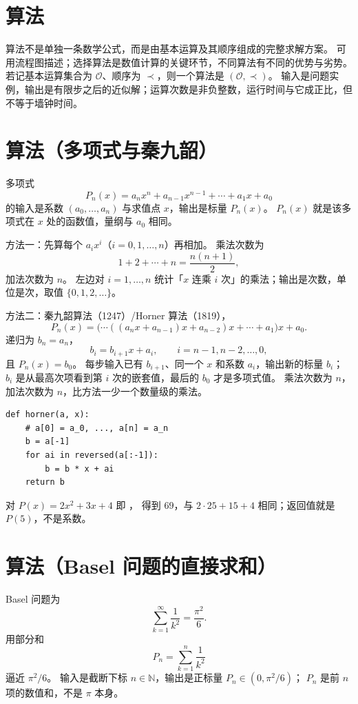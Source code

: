 \section{算法}

算法不是单独一条数学公式，而是由基本运算及其顺序组成的完整求解方案。
可用流程图描述；选择算法是数值计算的关键环节，不同算法有不同的优势与劣势。
若记基本运算集合为 $\mathcal{O}$、顺序为 $\prec$，则一个算法是 $(\mathcal{O},\prec)$。
输入是问题实例，输出是有限步之后的近似解；运算次数是非负整数，运行时间与它成正比，但不等于墙钟时间。

\section{算法（多项式与秦九韶）}

多项式
\[
P_n(x)=a_n x^n+a_{n-1}x^{n-1}+\cdots+a_1 x+a_0
\]
的输入是系数 $(a_0,\ldots,a_n)$ 与求值点 $x$，输出是标量 $P_n(x)$。
$P_n(x)$ 就是该多项式在 $x$ 处的函数值，量纲与 $a_0$ 相同。

方法一：先算每个 $a_i x^i$（$i=0,1,\ldots,n$）再相加。
乘法次数为
\[
1+2+\cdots+n=\frac{n(n+1)}{2},
\]
加法次数为 $n$。
左边对 $i=1,\ldots,n$ 统计「$x$ 连乘 $i$ 次」的乘法；输出是次数，单位是次，取值 $\{0,1,2,\ldots\}$。

方法二：秦九韶算法（1247）/Horner 算法（1819），
\[
P_n(x)=\bigl(\cdots((a_n x+a_{n-1})x+a_{n-2})x+\cdots+a_1\bigr)x+a_0.
\]
递归为 $b_n=a_n$，
\[
b_i=b_{i+1}x+a_i,\qquad i=n-1,n-2,\ldots,0,
\]
且 $P_n(x)=b_0$。
每步输入已有 $b_{i+1}$、同一个 $x$ 和系数 $a_i$，输出新的标量 $b_i$；
$b_i$ 是从最高次项看到第 $i$ 次的嵌套值，最后的 $b_0$ 才是多项式值。
乘法次数为 $n$，加法次数为 $n$，比方法一少一个数量级的乘法。

\begin{lstlisting}
def horner(a, x):
    # a[0] = a_0, ..., a[n] = a_n
    b = a[-1]
    for ai in reversed(a[:-1]):
        b = b * x + ai
    return b
\end{lstlisting}
对 $P(x)=2x^2+3x+4$ 即 ， 得到 $69$，与 $2\cdot 25+15+4$ 相同；返回值就是 $P(5)$，不是系数。

\section{算法（Basel 问题的直接求和）}

Basel 问题为
\[
\sum_{k=1}^{\infty}\frac{1}{k^2}=\frac{\pi^2}{6}.
\]
用部分和
\[
P_n=\sum_{k=1}^{n}\frac{1}{k^2}
\]
逼近 $\pi^2/6$。
输入是截断下标 $n\in\mathbb{N}$，输出是正标量 $P_n\in(0,\pi^2/6)$；
$P_n$ 是前 $n$ 项的数值和，不是 $\pi$ 本身。

